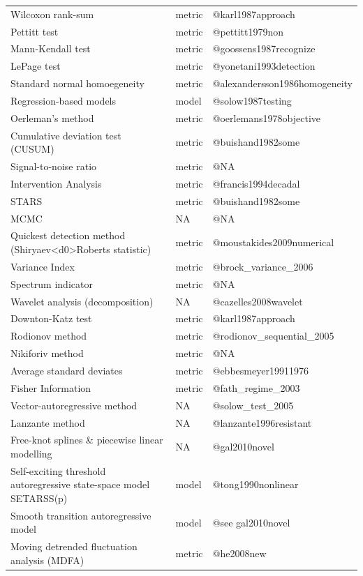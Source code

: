 \documentclass[12pt,twoside,openany]{reedthesis}
\begin{document}
\begin{longtable}{lll}
\addlinespace
Wilcoxon rank-sum & metric & @karl1987approach\\
Pettitt test & metric & @pettitt1979non\\
Mann-Kendall test & metric & @goossens1987recognize\\
LePage test & metric & @yonetani1993detection\\
Standard normal homoegeneity & metric & @alexandersson1986homogeneity\\
\addlinespace
Regression-based models & model & @solow1987testing\\
Oerleman's method & metric & @oerlemans1978objective\\
Cumulative deviation test (CUSUM) & metric & @buishand1982some\\
Signal-to-noise ratio & metric & @NA\\
Intervention Analysis & metric & @francis1994decadal\\
\addlinespace
STARS & metric & @buishand1982some\\
MCMC & NA & @NA\\
Quickest detection method (Shiryaev<d0>Roberts statistic) & metric & @moustakides2009numerical\\
Variance Index & metric & @brock\_variance\_2006\\
Spectrum indicator & metric & @NA\\
\addlinespace
Wavelet analysis (decomposition) & NA & @cazelles2008wavelet\\
Downton-Katz test & metric & @karl1987approach\\
Rodionov method & metric & @rodionov\_sequential\_2005\\
Nikiforiv method & metric & @NA\\
Average standard deviates & metric & @ebbesmeyer19911976\\
\addlinespace
Fisher Information & metric & @fath\_regime\_2003\\
Vector-autoregressive method & NA & @solow\_test\_2005\\
Lanzante method & NA & @lanzante1996resistant\\
Free-knot splines \& piecewise linear modelling & NA & @gal2010novel\\
Self-exciting threshold autoregressive state-space model SETARSS(p) & model & @tong1990nonlinear\\
\addlinespace
Smooth transition autoregressive model & model & @see gal2010novel\\
Moving detrended fluctuation analysis (MDFA) & metric & @he2008new\\

\end{longtable}
\end{document}
